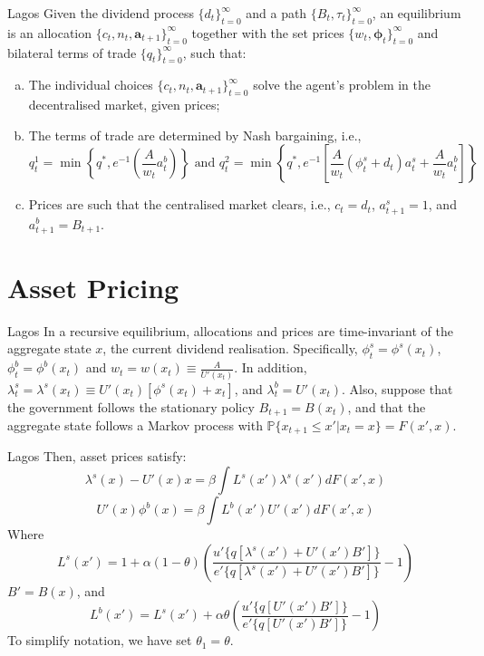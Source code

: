\documentclass[aspectratio=169,xcolor=dvipsnames]{beamer}
\begin{document}
\begin{frame}{Lagos}
    Given the dividend process $\{d_t\}_{t=0}^\infty$ and a path $\{B_t, \tau_t\}_{t=0}^\infty$, an equilibrium is an allocation $\{c_t, n_t, \mathbf{a}_{t+1}\}_{t=0}^\infty$ together with the set prices $\{w_t, \boldsymbol{\phi}_t\}_{t=0}^\infty$ and bilateral terms of trade $\{q_t\}_{t=0}^\infty$, such that:
    \begin{enumerate}[(a)]
        \item The individual choices $\{c_t, n_t, \mathbf{a}_{t+1}\}_{t=0}^\infty$ solve the agent's problem in the decentralised market, given prices;
        \item The terms of trade are determined by Nash bargaining, i.e.,
        \[
            q^1_t = \min \left\{ q^*, e^{-1} \left( \frac{A}{w_t} a^b_t\right)\right\} \text{ and } q^2_t = \min \left\{ q^*, e^{-1} \left[ \frac{A}{w_t}(\phi^s_t + d_t) a^s_t + \frac{A}{w_t} a^b_t\right]\right\}
        \]
        \item Prices are such that the centralised market clears, i.e., $c_t = d_t$, $a^s_{t+1} = 1$, and $a^b_{t+1} = B_{t+1}$.
    \end{enumerate}
\end{frame}

\section{Asset Pricing}

\begin{frame}{Lagos}
    In a recursive equilibrium, allocations and prices are time-invariant of the aggregate state $x$, the current dividend realisation. Specifically, $\phi^s_t = \phi^s(x_t)$, $\phi^b_t = \phi^b(x_t)$ and $w_t = w(x_t) \equiv \frac{A}{U'(x_t)}$. In addition, $\lambda^s_t = \lambda^s(x_t) \equiv U'(x_t)[\phi^s(x_t) + x_t]$, and $\lambda^b_t = U'(x_t)$. Also, suppose that the government follows the stationary policy $B_{t+1} = B(x_t)$, and that the aggregate state follows a Markov process with $\mathbb{P}\{x_{t+1} \le x'| x_t = x\} = F(x', x)$.
\end{frame}

\begin{frame}{Lagos}
    Then, asset prices satisfy:
    \[
        \lambda^s(x) - U'(x) x = \beta \int L^s(x') \lambda^s(x') dF(x', x)
    \]
    \[
        U'(x) \phi^b(x) = \beta \int L^b(x') U'(x') dF(x', x)
    \]
    Where
    \[
        L^s(x') = 1 + \alpha(1-\theta) \left( \frac{u'\{q[\lambda^s(x') + U'(x') B']\}}{e'\{q[\lambda^s(x') + U'(x') B']\}} - 1\right)
    \]
    $B' = B(x)$, and
    \[
        L^b(x') = L^s(x') + \alpha \theta \left( \frac{u'\{q[U'(x') B']\}}{e'\{q[U'(x') B']\}} - 1\right)
    \]
    To simplify notation, we have set $\theta_1 = \theta$.
\end{frame}
\end{document}
